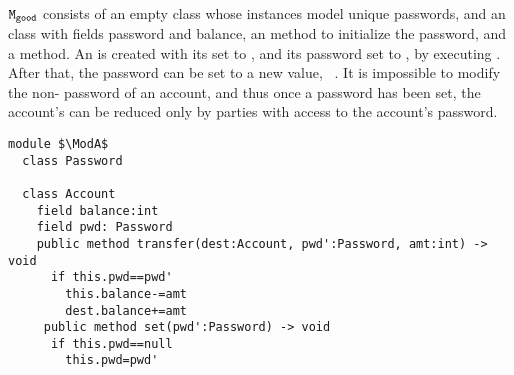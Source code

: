 {%
${\texttt{M}}_{{\texttt{good}}}$ consists of an empty class   whose instances model  unique passwords}, and an  class with fields  password and  balance, an  method to initialize the password, and  a  method. 
An  is created with its  set to , and its password set to , \eg by executing .
 After that, the password can be set to a new value,  \eg\,   . 
It is impossible to modify the  non- password of an account, and thus once a password has been set, the account's {can be reduced only 
by parties with access to the account's password.}
 

\begin{lstlisting}[mathescape=true, language=Chainmail, frame=lines]
module $\ModA$        
  class Password
  
  class Account
    field balance:int 
    field pwd: Password
    public method transfer(dest:Account, pwd':Password, amt:int) -> void
      if this.pwd==pwd'
        this.balance-=amt
        dest.balance+=amt
     public method set(pwd':Password) -> void
      if this.pwd==null
        this.pwd=pwd'
\end{lstlisting}
%
\noindent 
%
 
